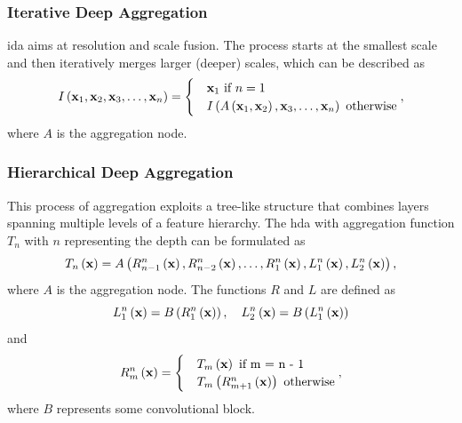 \subsubsection{Iterative Deep Aggregation}

\gls{ida} aims at resolution and scale fusion. The process starts at the smallest scale and then iteratively merges larger (deeper) scales, which can be described as
\begin{equation}
    \label{eq:IterativeDeepAggregation}
    {I} \left( \mathbf{x}_1, \mathbf{x}_2, \mathbf{x}_3, \dots, \mathbf{x}_n \right) =
    \begin{cases}
         & \mathbf{x}_1 \text{ if } n = 1                                                                \\
         & {I} \left( {A} \left( \mathbf{x}_1, \mathbf{x}_2 \right), \mathbf{x}_3, \dots, \mathbf{x}_n \right) \text{ otherwise}
    \end{cases},
\end{equation}
where $A$ is the aggregation node.

\subsubsection{Hierarchical Deep Aggregation}

This process of aggregation exploits a tree-like structure that combines layers spanning multiple levels of a feature hierarchy. The \gls{hda} with aggregation function $T_n$ with $n$ representing the depth can be formulated as
\begin{equation}
    \label{eq:HierarchicalDeepAggregation}
    {T_n} \left( \mathbf{x} \right) =
    {A} \left( 
        {{R}_{n - 1}^{n}} \left( \mathbf{x} \right),
        {{R}_{n - 2}^{n}} \left( \mathbf{x} \right),
        \dots,
        {{R}_{1}^{n}} \left( \mathbf{x} \right),
        {{L}_{1}^{n}} \left( \mathbf{x} \right),
        {{L}_{2}^{n}} \left( \mathbf{x} \right)
     \right),
\end{equation}
where $A$ is the aggregation node. The functions $R$ and $L$ are defined as
\begin{equation}
    \label{eq:HDAConvBlocksL}
    {{L}_{1}^{n}} \left( \mathbf{x} \right) = {B} \left( {{R}_{1}^{n}} \left( \mathbf{x} \right) \right),
    \quad
    {{L}_{2}^{n}} \left( \mathbf{x} \right) = {B} \left( {{L}_{1}^{n}} \left( \mathbf{x} \right) \right)
\end{equation}
and
\begin{equation}
    \label{eq:DLAConvBlocksR}
    \func{\subsup{R}{m}{n}}{\vect{x}} =
    \begin{cases}
         & \func{T_m}{\vect{x}} \text{ if } $m = n - 1$                        \\
         & \func{T_m}{\func{\subsup{R}{m + 1}{n}}{\vect{x}}} \text{ otherwise}
    \end{cases},
\end{equation}
where $B$ represents some convolutional block.
